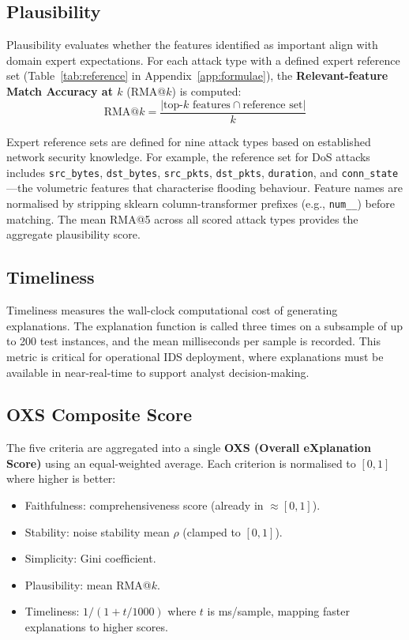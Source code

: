 \documentclass[12pt,a4paper]{report}
\begin{document}
\subsection{Plausibility}
\label{sec:plausibility}

Plausibility evaluates whether the features identified as important align with domain expert expectations. For each attack type with a defined expert reference set (Table~\ref{tab:reference} in Appendix~\ref{app:formulae}), the \textbf{Relevant-feature Match Accuracy at $k$} (RMA@$k$) is computed:
\begin{equation}
\text{RMA@}k = \frac{|\text{top-}k \text{ features} \cap \text{reference set}|}{k}
\end{equation}

Expert reference sets are defined for nine attack types based on established network security knowledge. For example, the reference set for DoS attacks includes \texttt{src\_bytes}, \texttt{dst\_bytes}, \texttt{src\_pkts}, \texttt{dst\_pkts}, \texttt{duration}, and \texttt{conn\_state}---the volumetric features that characterise flooding behaviour. Feature names are normalised by stripping sklearn column-transformer prefixes (e.g., \texttt{num\_\_}) before matching. The mean RMA@5 across all scored attack types provides the aggregate plausibility score.

\subsection{Timeliness}
\label{sec:timeliness}

Timeliness measures the wall-clock computational cost of generating explanations. The explanation function is called three times on a subsample of up to 200 test instances, and the mean milliseconds per sample is recorded. This metric is critical for operational IDS deployment, where explanations must be available in near-real-time to support analyst decision-making.

\subsection{OXS Composite Score}
\label{sec:oxs}

The five criteria are aggregated into a single \textbf{OXS (Overall eXplanation Score)} using an equal-weighted average. Each criterion is normalised to $[0, 1]$ where higher is better:

\begin{itemize}
  \item Faithfulness: comprehensiveness score (already in $\approx [0, 1]$).
  \item Stability: noise stability mean $\rho$ (clamped to $[0, 1]$).
  \item Simplicity: Gini coefficient.
  \item Plausibility: mean RMA@$k$.
  \item Timeliness: $1 / (1 + t / 1000)$ where $t$ is ms/sample, mapping faster explanations to higher scores.
\end{itemize}
\end{document}
